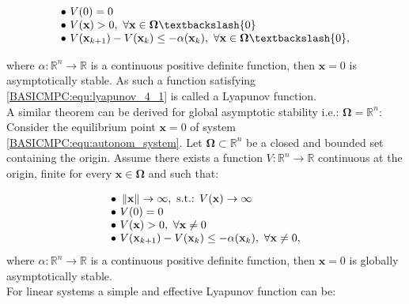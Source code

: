     \begin{equation}
        \begin{array}{l}
                \bullet\textnormal{ } V(0)=0\\
                \bullet\textnormal{ } V(\textbf{x})>0,\textnormal{ }\forall\textbf{x}\in\boldsymbol{\Omega}\textbackslash\{0\}\\
                \bullet\textnormal{ } V(\textbf{x}_{k+1})-V(\textbf{x}_{k})\leq-\alpha(\textbf{x}_k),\textnormal{ }\forall\textbf{x}\in\boldsymbol{\Omega}\textbackslash\{0\},
            \end{array}
            \label{BASICMPC:equ:lyapunov_4_1}
        \end{equation}

     where $\alpha:\mathbb{R}^n\rightarrow\mathbb{R}$ is a continuous positive definite function, then $\textbf{x}=0$ is asymptotically stable. As such a function satisfying \ref{BASICMPC:equ:lyapunov_4_1} is called a Lyapunov function.\\
     A similar theorem can be derived for global asymptotic stability i.e.: $\boldsymbol{\Omega}=\mathbb{R}^n$:
     Consider the equilibrium point $\textbf{x}=0$ of system \ref{BASICMPC:equ:autonom_system}. Let $\boldsymbol{\Omega}\subset\mathbb{R}^n$ be a closed and bounded set containing the origin. Assume there exists a function $V:\mathbb{R}^n\rightarrow\mathbb{R}$ continuous at the origin, finite for every $\textbf{x}\in\boldsymbol{\Omega}$ and such that:

     \begin{equation}
        \begin{array}{l}
                \bullet\textnormal{ }\left\lVert\textbf{x}\right\rVert\rightarrow\infty,\textnormal{ s.t.: }V(\textbf{x})\rightarrow\infty\\
                \bullet\textnormal{ } V(0)=0\\
                \bullet\textnormal{ } V(\textbf{x})>0,\textnormal{ }\forall\textbf{x}\neq0\\
                \bullet\textnormal{ } V(\textbf{x}_{k+1})-V(\textbf{x}_{k})\leq-\alpha(\textbf{x}_k),\textnormal{ }\forall\textbf{x}\neq0,
            \end{array}
            \label{BASICMPC:equ:lyapunov_4_2}
        \end{equation}
     where $\alpha:\mathbb{R}^n\rightarrow\mathbb{R}$ is a continuous positive definite function, then $\textbf{x}=0$ is globally asymptotically stable.\\
     For linear systems a simple and effective Lyapunov function can be:

